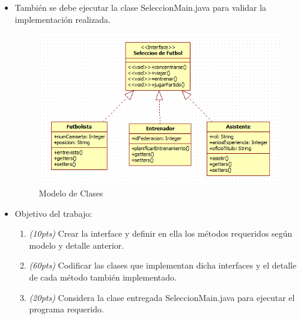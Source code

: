 \documentclass{exam}
\begin{document}
\begin{questions}
\begin{itemize}
\item Tambi\'en se debe ejecutar la clase SeleccionMain.java para validar la implementaci\'on realizada.



    \newpage
    \begin{figure}
      \centering
        \includegraphics{base/modeloSeleccion.png}
      \caption{Modelo de Clases}
      \label{fig:ejemplo}
    \end{figure}

\item Objetivo del trabajo:

  \begin{enumerate}
    \item \emph{(10pts)} Crear la interface y definir en ella los m\'etodos requeridos seg\'un  modelo y detalle anterior.
    \item \emph{(60pts)} Codificar las clases que implementan dicha interfaces y el detalle de cada m\'etodo tambi\'en implementado.
    \item \emph{(20pts)} Considera la clase entregada SeleccionMain.java para ejecutar el programa requerido.
  \end{enumerate}


\end{itemize}
\end{questions}
\end{document}
